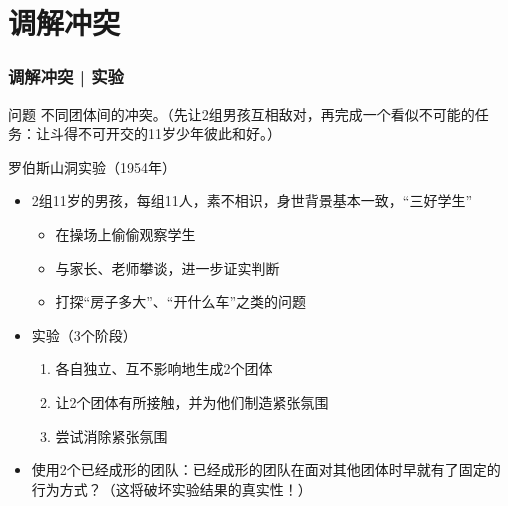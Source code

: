 \section{调解冲突}
\begin{frame}
  \frametitle{调解冲突 | 实验}
  \begin{block}{问题}
    不同团体间的冲突。（先让2组男孩互相敌对，再完成一个看似不可能的任务：让斗得不可开交的11岁少年彼此和好。）
  \end{block}
  \pause
  \begin{block}{罗伯斯山洞实验（1954年）}
    \begin{itemize}
      \item 2组11岁的男孩，每组11人，素不相识，身世背景基本一致，“三好学生”
        \begin{itemize}
          \item 在操场上偷偷观察学生
          \item 与家长、老师攀谈，进一步证实判断
          \item 打探“房子多大”、“开什么车”之类的问题
        \end{itemize}
      \item 实验（3个阶段）
        \begin{enumerate}
          \item 各自独立、互不影响地生成2个团体
          \item 让2个团体有所接触，并为他们制造紧张氛围
          \item 尝试消除紧张氛围
        \end{enumerate}
      \item 使用2个已经成形的团队：已经成形的团队在面对其他团体时早就有了固定的行为方式？（这将破坏实验结果的真实性！）
    \end{itemize}
  \end{block}
\end{frame}

